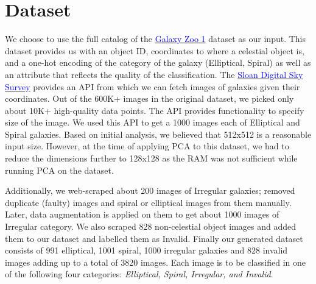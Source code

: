 \section{Dataset}

We choose to use the full catalog of the \href{https://data.galaxyzoo.org/}{\textcolor{blue}{Galaxy Zoo 1}} dataset as our input. This dataset provides us with an object ID, coordinates to where a celestial object is, and a one-hot encoding of the category of the galaxy (Elliptical, Spiral) as well as an attribute that reflects the quality of the classification. The \href{https://classic.sdss.org/dr7/}{\textcolor{blue}{Sloan Digital Sky Survey}} provides an API from which we can fetch images of galaxies given their coordinates. Out of the 600K+ images in the original dataset, we picked only about 10K+ high-quality data points. The API provides functionality to specify size of the image. We used this API to get a 1000 images each of Elliptical and Spiral galaxies. Based on initial analysis, we believed that 512x512 is a reasonable input size. However, at the time of applying PCA to this dataset, we had to reduce the dimensions further to 128x128 as the RAM was not sufficient while running PCA on the dataset.

Additionally, we web-scraped about 200 images of Irregular galaxies; removed duplicate (faulty) images and spiral or elliptical images from them manually. Later, data augmentation is applied on them to get about 1000 images of Irregular category. We also scraped 828 non-celestial object images and added them to our dataset and labelled them as Invalid. Finally our generated dataset consists of 991 elliptical, 1001 spiral, 1000 irregular galaxies and 828 invalid images adding up to a total of 3820 images. Each image is to be classified in one of the following four categories: \textit{Elliptical, Spiral, Irregular, and Invalid}.
